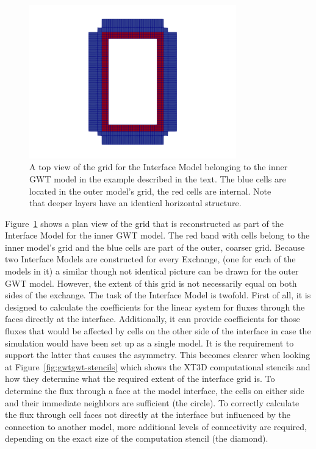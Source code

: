 \begin{figure}[!ht]
	\begin{center}
	\includegraphics[width=0.8\textwidth]{./Figures/InterfaceModel/gwt-ifmod-grid.png}
	\caption[A top view of the Interface Model grid]{A top view of the grid for the Interface Model belonging to the inner GWT model in the example described in the text. The blue cells are located in the outer model’s grid, the red cells are internal. Note that deeper layers have an identical horizontal structure.}
	\label{fig:gwtgwt-interface-grid}
	\end{center}
\end{figure}

Figure~\ref{fig:gwtgwt-interface-grid} shows a plan view of the grid that is reconstructed as part of the Interface Model for the inner GWT model. The red band with cells belong to the inner model’s grid and the blue cells are part of the outer, coarser grid. Because two Interface Models are constructed for every Exchange, (one for each of the models in it) a similar though not identical picture can be drawn for the outer GWT model. However, the extent of this grid is not necessarily equal on both sides of the exchange. The task of the Interface Model is twofold. First of all, it is designed to calculate the coefficients for the linear system for fluxes through the faces directly at the interface. Additionally, it can provide coefficients for those fluxes that would be affected by cells on the other side of the interface in case the simulation would have been set up as a single model. It is the requirement to support the latter that causes the asymmetry. This becomes clearer when looking at Figure~\ref{fig:gwtgwt-stencils} which shows the XT3D computational stencils and how they determine what the required extent of the interface grid is. To determine the flux through a face at the model interface, the cells on either side and their immediate neighbors are sufficient (the circle). To correctly calculate the flux through cell faces not directly at the interface but influenced by the connection to another model, more additional levels of connectivity are required, depending on the exact size of the computation stencil (the diamond).

